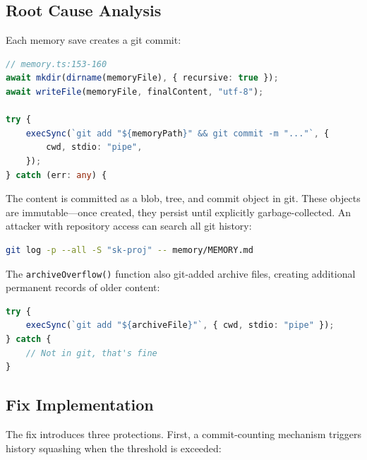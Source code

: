 \subsection*{Root Cause Analysis}
Each memory save creates a git commit:

\begin{lstlisting}[language=TypeScript]
// memory.ts:153-160
await mkdir(dirname(memoryFile), { recursive: true });
await writeFile(memoryFile, finalContent, "utf-8");

try {
    execSync(`git add "${memoryPath}" && git commit -m "..."`, {
        cwd, stdio: "pipe",
    });
} catch (err: any) {
\end{lstlisting}

The content is committed as a blob, tree, and commit object in git. These objects are immutable---once created, they persist until explicitly garbage-collected. An attacker with repository access can search all git history:

\begin{lstlisting}[language=bash]
git log -p --all -S "sk-proj" -- memory/MEMORY.md
\end{lstlisting}

The \texttt{archiveOverflow()} function also git-added archive files, creating additional permanent records of older content:

\begin{lstlisting}[language=TypeScript]
try {
    execSync(`git add "${archiveFile}"`, { cwd, stdio: "pipe" });
} catch {
    // Not in git, that's fine
}
\end{lstlisting}

\subsection*{Fix Implementation}
The fix introduces three protections. First, a commit-counting mechanism triggers history squashing when the threshold is exceeded:

